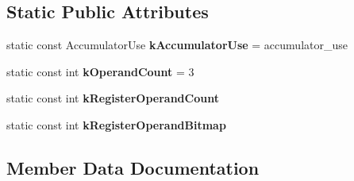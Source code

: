 \subsection*{Static Public Attributes}
\begin{DoxyCompactItemize}
\item 
static const Accumulator\+Use {\bfseries k\+Accumulator\+Use} = accumulator\+\_\+use\hypertarget{structv8_1_1internal_1_1interpreter_1_1_bytecode_traits_3_01accumulator__use_00_01operand__0_00_7bc7f22e039a5dadb0419dc05f939673_a730923fc4f1f89a23159a4243550818b}{}\label{structv8_1_1internal_1_1interpreter_1_1_bytecode_traits_3_01accumulator__use_00_01operand__0_00_7bc7f22e039a5dadb0419dc05f939673_a730923fc4f1f89a23159a4243550818b}

\item 
static const int {\bfseries k\+Operand\+Count} = 3\hypertarget{structv8_1_1internal_1_1interpreter_1_1_bytecode_traits_3_01accumulator__use_00_01operand__0_00_7bc7f22e039a5dadb0419dc05f939673_ad1d4f1cfb15803cf6f70cdb1736eef3b}{}\label{structv8_1_1internal_1_1interpreter_1_1_bytecode_traits_3_01accumulator__use_00_01operand__0_00_7bc7f22e039a5dadb0419dc05f939673_ad1d4f1cfb15803cf6f70cdb1736eef3b}

\item 
static const int {\bfseries k\+Register\+Operand\+Count}
\item 
static const int {\bfseries k\+Register\+Operand\+Bitmap}
\end{DoxyCompactItemize}


\subsection{Member Data Documentation}
